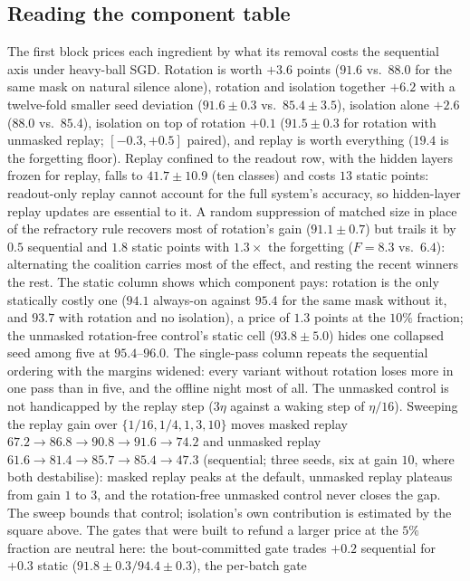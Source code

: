 \documentclass{article}
\begin{document}
\subsection{Reading the component table}
The first block prices each ingredient by what its removal costs the sequential axis under
heavy-ball SGD. Rotation is worth $+3.6$ points ($91.6$ vs.\ $88.0$ for the same mask on
natural silence alone), rotation and isolation together $+6.2$ with a twelve-fold smaller
seed deviation ($91.6\pm0.3$ vs.\ $85.4\pm3.5$), isolation alone $+2.6$ ($88.0$ vs.\
$85.4$), isolation on top of rotation $+0.1$ ($91.5\pm0.3$ for rotation with unmasked
replay; $[-0.3,+0.5]$ paired), and replay is worth everything ($19.4$ is the forgetting
floor). Replay confined to the readout row, with the hidden layers frozen for replay, falls
to $41.7\pm10.9$ (ten classes) and costs $13$ static points: readout-only replay cannot
account for the full system's accuracy, so hidden-layer replay updates are essential to it.
A random suppression of matched size in place of the refractory rule recovers most of
rotation's gain ($91.1\pm0.7$) but trails it by $0.5$ sequential and $1.8$ static points
with $1.3\times$ the forgetting ($F{=}8.3$ vs.\ $6.4$): alternating the coalition carries
most of the effect, and resting the recent winners the rest. The static column shows which
component pays: rotation is the only statically costly one ($94.1$ always-on against
$95.4$ for the same mask without it, and $93.7$ with rotation and no isolation), a price of
$1.3$ points at the $10\%$ fraction; the unmasked rotation-free control's static cell
($93.8\pm5.0$) hides one collapsed seed among five at $95.4$--$96.0$. The single-pass column
repeats the sequential ordering with the margins widened: every variant without rotation
loses more in one pass than in five, and the offline night most of all. The unmasked
control is not handicapped by the
replay step ($3\eta$ against a waking step of $\eta/16$). Sweeping the replay gain over
$\{1/16,1/4,1,3,10\}$ moves masked replay $67.2\to86.8\to90.8\to91.6\to74.2$ and unmasked
replay $61.6\to81.4\to85.7\to85.4\to47.3$ (sequential; three seeds, six at gain $10$, where
both destabilise): masked replay peaks at the default, unmasked replay plateaus from gain $1$
to $3$, and the rotation-free unmasked control never closes the gap. The sweep bounds that
control; isolation's own contribution is estimated by the square above. The gates that were
built to refund a larger price at the $5\%$ fraction are neutral here: the bout-committed
gate trades $+0.2$ sequential for $+0.3$ static ($91.8\pm0.3/94.4\pm0.3$), the per-batch gate
\end{document}
